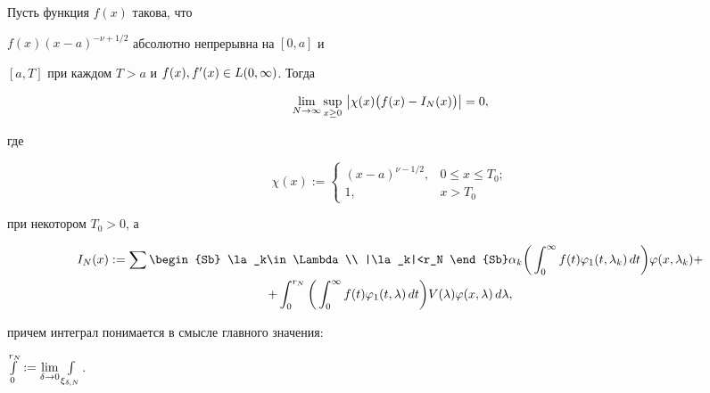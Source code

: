 \begin{thm}


Пусть функция $f(x)$ такова, что


$f(x)(x-a)^{-\nu+1/2}$ абсолютно непрерывна на $[0,a]$ и


$[a,T]$ при каждом $T>a$ и $f(x),f'(x)\in L(0,\infty)$. Тогда


\begin{equation}


\lim_{N\to\iy}\sup_{x\ge 0}\,


\big|\chi(x)\big(f(x)-I_N(x)\big)\big|=0,


\end{equation}


где


$$


\chi(x):=


\begin{cases}


(x-a)^{\nu-1/2}, & 0\le x\le T_0; \\ 1, & x>T_0


\end{cases}


$$


при некотором $T_0>0$, а


\begin{multline}


I_N(x):=\sum\begin{Sb} \la_k\in\Lambda\\ |\la_k|<r_N \end{Sb} \al _k


\bigg(\int_0^\iy f(t)\vv_1(t,\la_k)\,dt\bigg)\vv(x,\la_k)+ \\


+\int_{0}^{r_N}


\bigg(\int_0^\iy f(t)\vv_1(t,\la)\,dt\bigg)V(\la)\vv(x,\la)\,d\la,


\end{multline}


причем интеграл понимается в смысле главного значения$:$


$\int\limits_{0}^{r_N}:=\lim\limits_{\delta\to 0}\int\limits_{\xi_{\delta,N}}$.


\end{thm}





